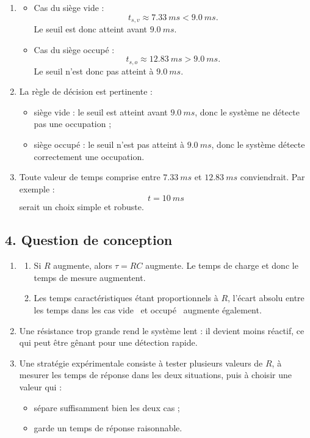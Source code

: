 \documentclass[11pt,a4paper]{article}
\begin{document}
\begin{enumerate}
    \item 
    \begin{itemize}
        \item Cas du siège vide :
        \[
        t_{s,v}\approx \SI{7.33}{ms}<\SI{9.0}{ms}.
        \]
        Le seuil est donc atteint avant \(\SI{9.0}{ms}\).

        \item Cas du siège occupé :
        \[
        t_{s,o}\approx \SI{12.83}{ms}>\SI{9.0}{ms}.
        \]
        Le seuil n'est donc pas atteint à \(\SI{9.0}{ms}\).
    \end{itemize}

    \item La règle de décision est pertinente :
    \begin{itemize}
        \item siège vide : le seuil est atteint avant \(\SI{9.0}{ms}\), donc le système ne détecte pas une occupation ;
        \item siège occupé : le seuil n'est pas atteint à \(\SI{9.0}{ms}\), donc le système détecte correctement une occupation.
    \end{itemize}

    \item Toute valeur de temps comprise entre \(\SI{7.33}{ms}\) et \(\SI{12.83}{ms}\) conviendrait. Par exemple :
    \[
    t=\SI{10}{ms}
    \]
    serait un choix simple et robuste.
\end{enumerate}

\subsection*{4. Question de conception}

\begin{enumerate}
    \item 
    \begin{enumerate}[label=\alph*)]
        \item Si \(R\) augmente, alors \(\tau=RC\) augmente. Le temps de charge et donc le temps de mesure augmentent.
        \item Les temps caractéristiques étant proportionnels à \(R\), l'écart absolu entre les temps dans les cas \og vide \fg\ et \og occupé \fg\ augmente également.
    \end{enumerate}

    \item Une résistance trop grande rend le système lent : il devient moins réactif, ce qui peut être gênant pour une détection rapide.

    \item Une stratégie expérimentale consiste à tester plusieurs valeurs de \(R\), à mesurer les temps de réponse dans les deux situations, puis à choisir une valeur qui :
    \begin{itemize}
        \item sépare suffisamment bien les deux cas ;
        \item garde un temps de réponse raisonnable.
    \end{itemize}
\end{enumerate}
\end{document}
